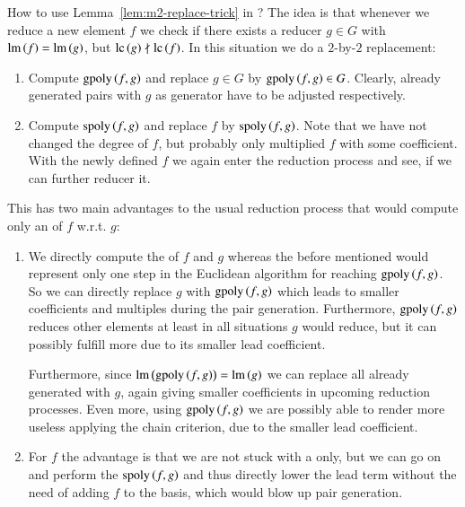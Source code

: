 How to use Lemma~\ref{lem:m2-replace-trick} in \bba ? The idea is that whenever
we reduce a new element $f$ we check if there exists a reducer $g\in G$ with
$\operatorname{lm}\left({f}\right) = \operatorname{lm}\left({g}\right)$, but $\mathrm{lc}\left({g}\right) \nmid \mathrm{lc}\left({f}\right)$. In this situation we do a $2$-by-$2$
replacement:
\begin{enumerate}
\item Compute $\mathrm{gpoly}\left({f},{g}\right)$ and replace $g\in G$ by $\mathrm{gpoly}\left({f},{g}\right) \in G$. Clearly,
already generated pairs with $g$ as generator have to be adjusted respectively.
\item Compute $\mathrm{spoly}\left({f},{g}\right)$ and replace $f$ by $\mathrm{spoly}\left({f},{g}\right)$. Note that we have not
changed the degree of $f$, but probably only multiplied $f$ with some
coefficient. With the newly defined $f$ we again enter the reduction process and
see, if we can further reducer it.
\end{enumerate}
This has two main advantages to the usual reduction process that would compute
only an \lcr of $f$ w.r.t. $g$:
\begin{enumerate}
\item We directly compute the \gpt of $f$ and $g$
whereas the before mentioned \lcr would represent only one step in the Euclidean
algorithm for reaching $\mathrm{gpoly}\left({f},{g}\right)$. So we can directly replace $g$ with
$\mathrm{gpoly}\left({f},{g}\right)$ which leads to smaller coefficients and multiples during the pair
generation. Furthermore, $\mathrm{gpoly}\left({f},{g}\right)$ reduces other elements at least in all
situations $g$ would reduce, but it can possibly fulfill more \ltrs due to its
smaller lead coefficient.

Furthermore, since $\operatorname{lm}\left({\mathrm{gpoly}\left({f},{g}\right)}\right) = \operatorname{lm}\left({g}\right)$ we can replace all \spts already generated
with $g$, again giving smaller coefficients in upcoming reduction processes.
Even more, using $\mathrm{gpoly}\left({f},{g}\right)$ we are possibly able to render more \spts useless
applying the chain criterion, due to the smaller lead coefficient.
\item For $f$ the advantage is that we are not stuck with a \lcr only, but we
can go on and perform the \ltr $\mathrm{spoly}\left({f},{g}\right)$ and thus directly lower the lead term
without the need of adding $f$ to the basis, which would blow up pair
generation.
\end{enumerate}

